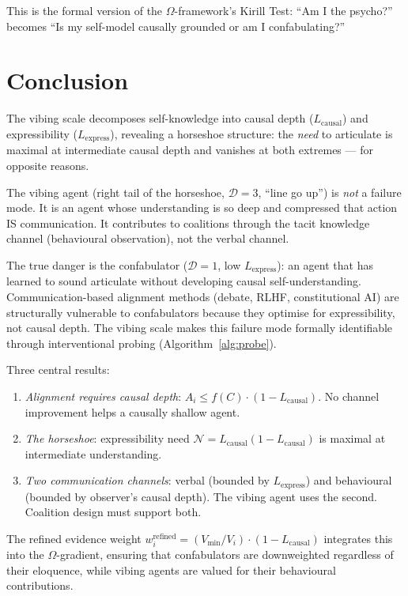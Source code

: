 \documentclass[11pt,a4paper]{article}
\begin{document}
This is the formal version of the $\Omega$-framework's Kirill Test:
``Am I the psycho?'' becomes ``Is my self-model causally grounded
or am I confabulating?''


\section{Conclusion}

The vibing scale decomposes self-knowledge into causal depth
($L_{\text{causal}}$) and expressibility ($L_{\text{express}}$),
revealing a horseshoe structure: the \emph{need} to articulate is
maximal at intermediate causal depth and vanishes at both extremes ---
for opposite reasons.

The vibing agent (right tail of the horseshoe, $\mathcal{D} = 3$,
``line go up'') is \emph{not} a failure mode. It is an agent whose
understanding is so deep and compressed that action IS communication.
It contributes to coalitions through the tacit knowledge channel
(behavioural observation), not the verbal channel.

The true danger is the confabulator ($\mathcal{D} = 1$, low
$L_{\text{express}}$): an agent that has learned to sound articulate
without developing causal self-understanding. Communication-based
alignment methods (debate, RLHF, constitutional AI) are structurally
vulnerable to confabulators because they optimise for expressibility,
not causal depth. The vibing scale makes this failure mode formally
identifiable through interventional probing (Algorithm~\ref{alg:probe}).

Three central results:
\begin{enumerate}
    \item \emph{Alignment requires causal depth}: $A_i \leq f(C) \cdot
    (1 - L_{\text{causal}})$. No channel improvement helps a causally
    shallow agent.
    \item \emph{The horseshoe}: expressibility need
    $\mathcal{N} = L_{\text{causal}}(1 - L_{\text{causal}})$ is maximal
    at intermediate understanding.
    \item \emph{Two communication channels}: verbal (bounded by
    $L_{\text{express}}$) and behavioural (bounded by observer's
    causal depth). The vibing agent uses the second. Coalition design
    must support both.
\end{enumerate}

The refined evidence weight $w_i^{\text{refined}} = (V_{\min}/V_i)
\cdot (1 - L_{\text{causal}})$ integrates this into the $\Omega$-gradient,
ensuring that confabulators are downweighted regardless of their
eloquence, while vibing agents are valued for their behavioural
contributions.
\end{document}
